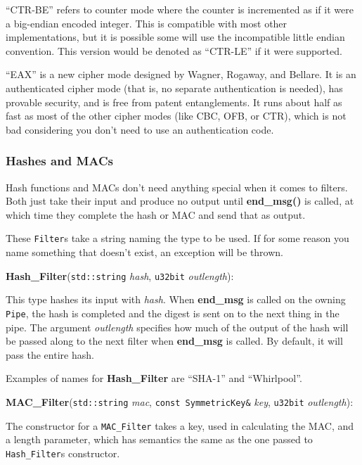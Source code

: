 \documentclass{article}
\newcommand{\function}[1]{\textbf{#1}}
\newcommand{\type}[1]{\texttt{#1}}
\renewcommand{\arg}[1]{\textsl{#1}}
\begin{document}
``CTR-BE'' refers to counter mode where the counter is incremented as
if it were a big-endian encoded integer. This is compatible with most
other implementations, but it is possible some will use the
incompatible little endian convention. This version would be denoted
as ``CTR-LE'' if it were supported.

``EAX'' is a new cipher mode designed by Wagner, Rogaway, and
Bellare. It is an authenticated cipher mode (that is, no separate
authentication is needed), has provable security, and is free from
patent entanglements. It runs about half as fast as most of the other
cipher modes (like CBC, OFB, or CTR), which is not bad considering you
don't need to use an authentication code.

\subsubsection{Hashes and MACs}

Hash functions and MACs don't need anything special when it comes to
filters. Both just take their input and produce no output until
\function{end\_msg()} is called, at which time they complete the hash or MAC
and send that as output.

These \type{Filter}s take a string naming the type to be used. If for some
reason you name something that doesn't exist, an exception will be thrown.

\noindent
\function{Hash\_Filter}(\type{std::string} \arg{hash},
                        \type{u32bit} \arg{outlength}):

This type hashes its input with \arg{hash}. When \function{end\_msg} is called
on the owning \type{Pipe}, the hash is completed and the digest is sent on to
the next thing in the pipe. The argument \arg{outlength} specifies how much of
the output of the hash will be passed along to the next filter when
\function{end\_msg} is called. By default, it will pass the entire hash.

Examples of names for \function{Hash\_Filter} are ``SHA-1'' and ``Whirlpool''.

\noindent
\function{MAC\_Filter}(\type{std::string} \arg{mac},
                       \type{const SymmetricKey\&} \arg{key},
                       \type{u32bit} \arg{outlength}):

The constructor for a \type{MAC\_Filter} takes a key, used in calculating the
MAC, and a length parameter, which has semantics the same as the one
passed to \type{Hash\_Filter}s constructor.
\end{document}
